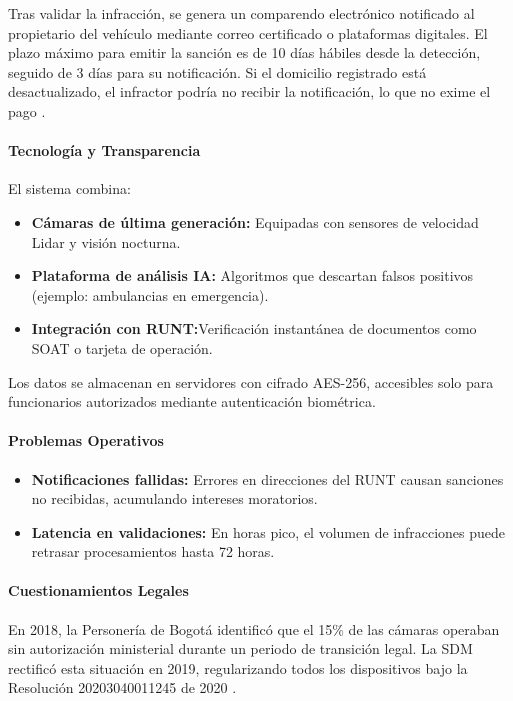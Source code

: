 \documentclass[
    letterpaper, 
    man,   
    spanish,
    12pt,
    donotrepeattitle,
    floatsintext,
    hidelinks %
]{apa7}
\begin{document}
Tras validar la infracción, se genera un comparendo electrónico notificado al propietario del vehículo mediante correo certificado o plataformas digitales. El plazo máximo para emitir la sanción es de 10 días hábiles desde la detección, seguido de 3 días para su notificación. Si el domicilio registrado está desactualizado, el infractor podría no recibir la notificación, lo que no exime el pago \parencite{ley1843}. 

\paragraph{Tecnología y Transparencia }
El sistema combina: 
\begin{itemize}
    \item \textbf{Cámaras de última generación: }Equipadas con sensores de velocidad Lidar y visión nocturna. 
    \item \textbf{Plataforma de análisis IA: }Algoritmos que descartan falsos positivos (ejemplo: ambulancias en emergencia). 
        \item \textbf{Integración con RUNT:}Verificación instantánea de documentos como SOAT o tarjeta de operación.
\end{itemize}

Los datos se almacenan en servidores con cifrado AES-256, accesibles solo para funcionarios autorizados mediante autenticación biométrica.

\paragraph{Problemas Operativos }
\begin{itemize}
    \item \textbf{Notificaciones fallidas: }Errores en direcciones del RUNT causan sanciones no recibidas, acumulando intereses moratorios. 
    \item \textbf{Latencia en validaciones:  }En horas pico, el volumen de infracciones puede retrasar procesamientos hasta 72 horas.
\end{itemize}

\paragraph{Cuestionamientos Legales }
En 2018, la Personería de Bogotá identificó que el 15\% de las cámaras operaban sin autorización ministerial durante un periodo de transición legal. La SDM rectificó esta situación en 2019, regularizando todos los dispositivos bajo la Resolución 20203040011245 de 2020 \parencite{secretaria_movilidad2023}. 
\end{document}
